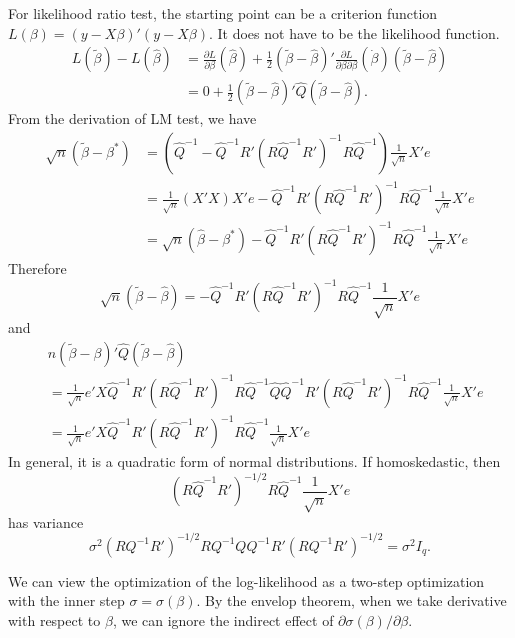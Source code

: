 \documentclass[11pt]{article}
\begin{document}
For likelihood ratio test, the starting point can be a criterion
function
\(L\left(\beta\right)=\left(y-X\beta\right)'\left(y-X\beta\right)\). It
does not have to be the likelihood function. \[\begin{aligned}
L\left(\tilde{\beta}\right)-L\left(\widehat{\beta}\right) & =\frac{\partial L}{\partial\beta}\left(\widehat{\beta}\right)+\frac{1}{2}\left(\tilde{\beta}-\widehat{\beta}\right)'\frac{\partial L}{\partial\beta\partial\beta}\left(\dot{\beta}\right)\left(\tilde{\beta}-\widehat{\beta}\right)\\
 & =0+\frac{1}{2}\left(\tilde{\beta}-\widehat{\beta}\right)'\widehat{Q}\left(\tilde{\beta}-\widehat{\beta}\right).\end{aligned}\]
From the derivation of LM test, we have \[\begin{aligned}
\sqrt{n}\left(\tilde{\beta}-\beta^{*}\right) 
 & =  \left(\widehat{Q}^{-1}-\widehat{Q}^{-1}R'\left(R\widehat{Q}^{-1}R'\right)^{-1}R\widehat{Q}^{-1}\right)\frac{1}{\sqrt{n}}X'e\\
 & =  \frac{1}{\sqrt{n}}\left(X'X\right)X'e-\widehat{Q}^{-1}R'\left(R\widehat{Q}^{-1}R'\right)^{-1}R\widehat{Q}^{-1}\frac{1}{\sqrt{n}}X'e\\
 & =  \sqrt{n}\left(\widehat{\beta}-\beta^{*}\right)-\widehat{Q}^{-1}R'\left(R\widehat{Q}^{-1}R'\right)^{-1}R\widehat{Q}^{-1}\frac{1}{\sqrt{n}}X'e
 \end{aligned}\] Therefore
\[\sqrt{n}\left(\tilde{\beta}-\widehat{\beta}\right)=-\widehat{Q}^{-1}R'\left(R\widehat{Q}^{-1}R'\right)^{-1}R\widehat{Q}^{-1}\frac{1}{\sqrt{n}}X'e\]
and \[\begin{aligned}
 &   n\left(\tilde{\beta}-\beta\right)'\widehat{Q}\left(\tilde{\beta}-\widehat{\beta}\right)\\
 & =  \frac{1}{\sqrt{n}}e'X\widehat{Q}^{-1}R'\left(R\widehat{Q}^{-1}R'\right)^{-1}R\widehat{Q}^{-1}\widehat{Q}\widehat{Q}^{-1}R'\left(R\widehat{Q}^{-1}R'\right)^{-1}R\widehat{Q}^{-1}\frac{1}{\sqrt{n}}X'e\\
 & =  \frac{1}{\sqrt{n}}e'X\widehat{Q}^{-1}R'\left(R\widehat{Q}^{-1}R'\right)^{-1}R\widehat{Q}^{-1}\frac{1}{\sqrt{n}}X'e
\end{aligned}\] In general, it is a quadratic form of normal
distributions. If homoskedastic, then
\[\left(R\widehat{Q}^{-1}R'\right)^{-1/2}R\widehat{Q}^{-1}\frac{1}{\sqrt{n}}X'e\]
has variance
\[\sigma^{2}\left(RQ^{-1}R'\right)^{-1/2}RQ^{-1}QQ^{-1}R'\left(RQ^{-1}R'\right)^{-1/2}=\sigma^{2}I_{q}.\]

We can view the optimization of the log-likelihood as a two-step
optimization with the inner step \(\sigma=\sigma\left(\beta\right)\). By
the envelop theorem, when we take derivative with respect to \(\beta\),
we can ignore the indirect effect of
\(\partial\sigma\left(\beta\right)/\partial\beta\).


    
    
    
    
\end{document}
